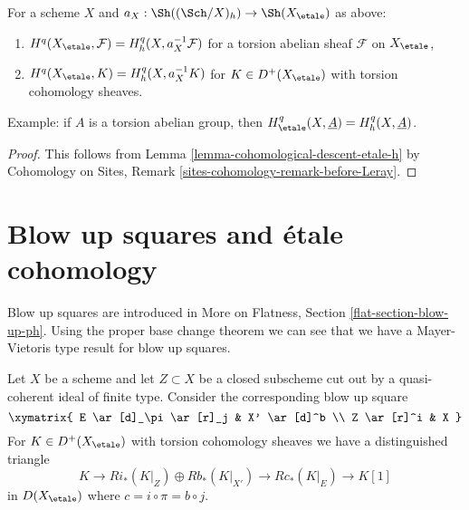 \begin{lemma}
\label{lemma-compare-cohomology-etale-h}
For a scheme $X$ and $a_X : \Sh((\Sch/X)_h) \to \Sh(X_\etale)$
as above:
\begin{enumerate}
\item $H^q(X_\etale, \mathcal{F}) = H^q_h(X, a_X^{-1}\mathcal{F})$
for a torsion abelian sheaf $\mathcal{F}$ on $X_\etale$,
\item $H^q(X_\etale, K) = H^q_h(X, a_X^{-1}K)$
for $K \in D^+(X_\etale)$ with torsion cohomology sheaves.
\end{enumerate}
Example: if $A$ is a torsion abelian group, then
$H^q_\etale(X, \underline{A}) = H^q_h(X, \underline{A})$.
\end{lemma}

\begin{proof}
This follows from Lemma \ref{lemma-cohomological-descent-etale-h}
by Cohomology on Sites, Remark \ref{sites-cohomology-remark-before-Leray}.
\end{proof}

















\section{Blow up squares and \'etale cohomology}
\label{section-blow-up-square}

\noindent
Blow up squares are introduced in
More on Flatness, Section \ref{flat-section-blow-up-ph}.
Using the proper base change theorem we can see that
we have a Mayer-Vietoris type result for blow up squares.

\begin{lemma}
\label{lemma-blow-up-square-cohomological-descent}
Let $X$ be a scheme and let $Z \subset X$ be a closed subscheme
cut out by a quasi-coherent ideal of finite type. Consider the
corresponding blow up square
$$
\xymatrix{
E \ar[d]_\pi \ar[r]_j & X' \ar[d]^b \\
Z \ar[r]^i & X
}
$$
For $K \in D^+(X_\etale)$ with torsion cohomology sheaves
we have a distinguished triangle
$$
K \to Ri_*(K|_Z) \oplus Rb_*(K|_{X'}) \to Rc_*(K|_E) \to K[1]
$$
in $D(X_\etale)$ where $c = i \circ \pi = b \circ j$.
\end{lemma}

